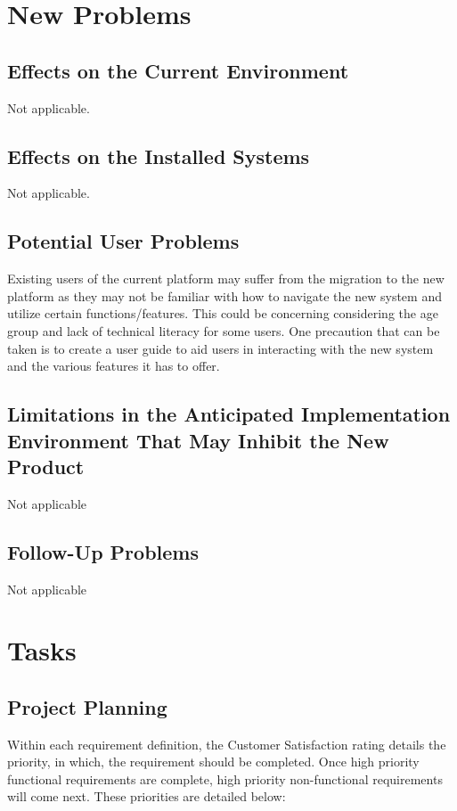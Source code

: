 \documentclass[12pt]{article}
\begin{document}
\section{New Problems}
\subsection{Effects on the Current Environment}
Not applicable.
\subsection{Effects on the Installed Systems}
Not applicable.
\subsection{Potential User Problems}

Existing users of the current platform may suffer from the migration
to the new platform as they may not be familiar with how to navigate
the new system and utilize certain functions/features. This could be
concerning considering the age group and lack of technical literacy
for some users. One precaution that can be taken is to create a user
guide to aid users in interacting with the new system and the various
features it has to offer.

\subsection{Limitations in the Anticipated Implementation Environment That May
Inhibit the New Product}
Not applicable
\subsection{Follow-Up Problems}
Not applicable

\section{Tasks}
\subsection{Project Planning}

Within each requirement definition, the Customer Satisfaction rating details the
priority, in which, the requirement should be completed. Once high priority
functional requirements are complete, high priority non-functional requirements
will come next. These priorities are detailed below: \\\\
\end{document}
